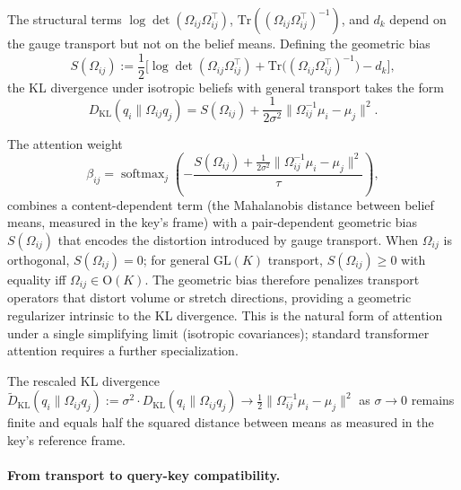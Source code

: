 \documentclass[11pt]{article}
\begin{document}
The structural terms $\log\det(\Omega_{ij}\Omega_{ij}^\top)$, $\mathrm{Tr}((\Omega_{ij}\Omega_{ij}^\top)^{-1})$, and $d_k$ depend on the gauge transport but not on the belief means. Defining the geometric bias
\begin{equation}
S(\Omega_{ij}) := \frac{1}{2}\Big[\log\det(\Omega_{ij}\Omega_{ij}^\top) + \mathrm{Tr}\big((\Omega_{ij}\Omega_{ij}^\top)^{-1}\big) - d_k\Big],
\end{equation}
the KL divergence under isotropic beliefs with general transport takes the form
\begin{equation}
D_{\mathrm{KL}}(q_i \| \Omega_{ij} q_j) = S(\Omega_{ij}) + \frac{1}{2\sigma^2}\|\Omega_{ij}^{-1}\mu_i - \mu_j\|^2.
\end{equation}

The attention weight
\begin{equation}
\beta_{ij} = \operatorname{softmax}_j\left(-\frac{S(\Omega_{ij}) + \frac{1}{2\sigma^2}\|\Omega_{ij}^{-1}\mu_i - \mu_j\|^2}{\tau}\right),
\end{equation}
combines a content-dependent term (the Mahalanobis distance between belief means, measured in the key's frame) with a pair-dependent geometric bias $S(\Omega_{ij})$ that encodes the distortion introduced by gauge transport. When $\Omega_{ij}$ is orthogonal, $S(\Omega_{ij}) = 0$; for general $\mathrm{GL}(K)$ transport, $S(\Omega_{ij}) \geq 0$ with equality iff $\Omega_{ij} \in \mathrm{O}(K)$. The geometric bias therefore penalizes transport operators that distort volume or stretch directions, providing a geometric regularizer intrinsic to the KL divergence. This is the natural form of attention under a single simplifying limit (isotropic covariances); standard transformer attention requires a further specialization.

The rescaled KL divergence $\widetilde{D}_{\mathrm{KL}}(q_i \| \Omega_{ij}q_j) := \sigma^2 \cdot D_{\mathrm{KL}}(q_i \| \Omega_{ij}q_j) \to \frac{1}{2}\|\Omega_{ij}^{-1}\mu_i - \mu_j\|^2$ as $\sigma \to 0$ remains finite and equals half the squared distance between means as measured in the key's reference frame.

\paragraph{From transport to query-key compatibility.}
\end{document}
